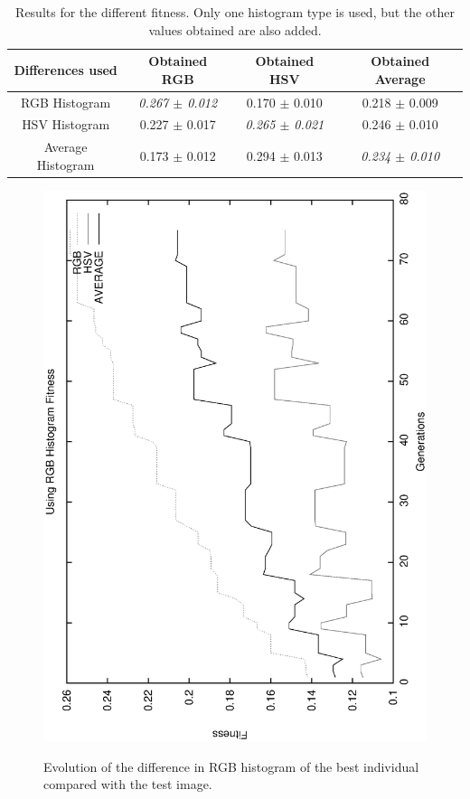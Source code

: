 \documentclass[conference]{IEEEtran}
\begin{document}
\begin{table}
\centering
\caption{Results for the different fitness. Only one histogram type is used, but the other values obtained are also added.}
\begin{tabular}{|c|c|c|c|} \hline
Differences used & Obtained RGB      		& Obtained HSV  & Obtained Average \\ \hline
RGB Histogram    & {\em 0.267 $\pm$ 0.012}	& 0.170 $\pm$ 0.010 	& 0.218 $\pm$ 0.009	\\ \hline
HSV Histogram    & 0.227 $\pm$ 0.017	& {\em 0.265 $\pm$ 0.021}	& 0.246 $\pm$ 0.010 \\ \hline
Average Histogram& 0.173 $\pm$ 0.012	& 0.294 $\pm$ 0.013	& {\em 0.234 $\pm$ 0.010} \\ \hline


\end{tabular}
\label{tab:results}
\end{table}

\begin{figure}
   \includegraphics[angle=-90,scale =0.35] {images/rgbgens.eps}
\label{fig:rgbgens}
\caption{Evolution of the difference in RGB histogram of the best individual compared with the test image. }
\end{figure}
\end{document}
